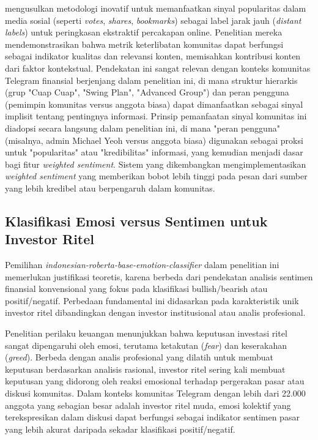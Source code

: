 \textcite{kano2018} mengusulkan metodologi inovatif untuk memanfaatkan sinyal popularitas dalam media sosial (seperti \textit{votes}, \textit{shares}, \textit{bookmarks}) sebagai label jarak jauh (\textit{distant labels}) untuk peringkasan ekstraktif percakapan online. Penelitian mereka mendemonstrasikan bahwa metrik keterlibatan komunitas dapat berfungsi sebagai indikator kualitas dan relevansi konten, memisahkan kontribusi konten dari faktor kontekstual. Pendekatan ini sangat relevan dengan konteks komunitas Telegram finansial berjenjang dalam penelitian ini, di mana struktur hierarkis (grup "Cuap Cuap", "Swing Plan", "Advanced Group") dan peran pengguna (pemimpin komunitas versus anggota biasa) dapat dimanfaatkan sebagai sinyal implisit tentang pentingnya informasi. Prinsip pemanfaatan sinyal komunitas ini diadopsi secara langsung dalam penelitian ini, di mana "peran pengguna" (misalnya, admin Michael Yeoh versus anggota biasa) digunakan sebagai proksi untuk "popularitas" atau "kredibilitas" informasi, yang kemudian menjadi dasar bagi fitur \textit{weighted sentiment}. Sistem yang dikembangkan mengimplementasikan \textit{weighted sentiment} yang memberikan bobot lebih tinggi pada pesan dari sumber yang lebih kredibel atau berpengaruh dalam komunitas.

\subsection{Klasifikasi Emosi versus Sentimen untuk Investor Ritel}

Pemilihan \textit{indonesian-roberta-base-emotion-classifier} dalam penelitian ini memerlukan justifikasi teoretis, karena berbeda dari pendekatan analisis sentimen finansial konvensional yang fokus pada klasifikasi bullish/bearish atau positif/negatif. Perbedaan fundamental ini didasarkan pada karakteristik unik investor ritel dibandingkan dengan investor institusional atau analis profesional.

Penelitian perilaku keuangan menunjukkan bahwa keputusan investasi ritel sangat dipengaruhi oleh emosi, terutama ketakutan (\textit{fear}) dan keserakahan (\textit{greed}). Berbeda dengan analis profesional yang dilatih untuk membuat keputusan berdasarkan analisis rasional, investor ritel sering kali membuat keputusan yang didorong oleh reaksi emosional terhadap pergerakan pasar atau diskusi komunitas. Dalam konteks komunitas Telegram dengan lebih dari 22.000 anggota yang sebagian besar adalah investor ritel muda, emosi kolektif yang terekspresikan dalam diskusi dapat berfungsi sebagai indikator sentimen pasar yang lebih akurat daripada sekadar klasifikasi positif/negatif.

